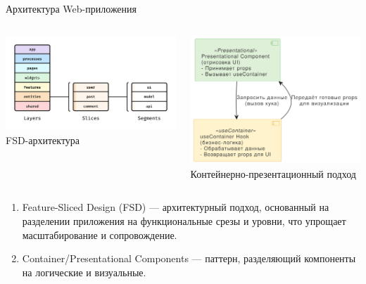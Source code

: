 \documentclass[aspectratio=169]{beamer}
\begin{document}
\begin{frame}{Архитектура Web-приложения}
\begin{columns}
    \begin{column}{0.45\textwidth}
        \centering
        \includegraphics[width=0.8\linewidth]{static/fsd-diagram.png} \\
        \small FSD-архитектура
    \end{column}
    \begin{column}{0.45\textwidth}
        \centering
        \includegraphics[width=0.8\linewidth]{static/container-presentational.png} \\
        \small Контейнерно-презентационный подход
    \end{column}
\end{columns}

\vspace{0.5em}

\small
\begin{enumerate}
  \item Feature-Sliced Design (FSD) — архитектурный подход, основанный на разделении приложения на функциональные срезы и уровни, что упрощает масштабирование и сопровождение.
  \item Container/Presentational Components — паттерн, разделяющий компоненты на логические и визуальные.
\end{enumerate}

\end{frame}
\end{document}
